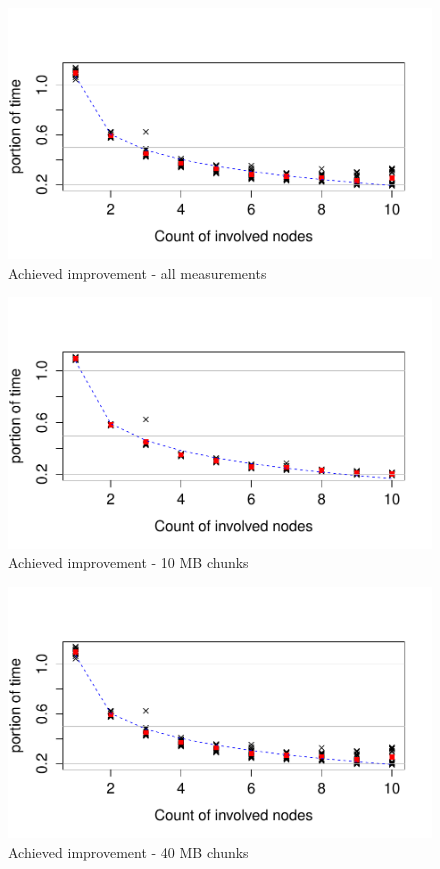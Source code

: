 \begin{figure}[h]
\begin{center}
\includegraphics[scale=0.90]{./img/Rplot.pdf}
\caption{Achieved improvement - all measurements}
\end{center}
\end{figure}

\begin{figure}[h]
\begin{center}
\includegraphics[scale=0.90]{./img/Rplot10k.pdf}
\caption{Achieved improvement - 10 MB chunks}
\end{center}
\end{figure}

\begin{figure}[h]
\begin{center}
\includegraphics[scale=0.90]{./img/Rplot.pdf}
\caption{Achieved improvement - 40 MB chunks}
\end{center}
\end{figure}

